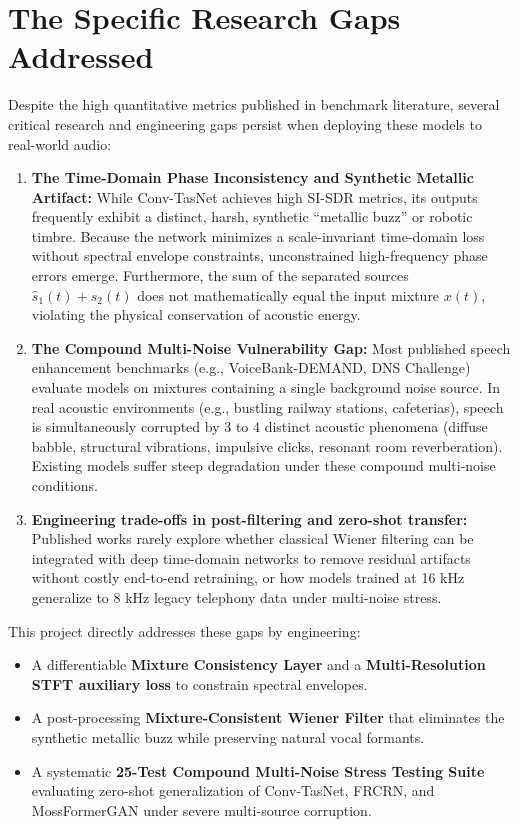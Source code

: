 \documentclass[11pt,a4paper]{report}
\begin{document}
\section{The Specific Research Gaps Addressed}
Despite the high quantitative metrics published in benchmark literature, several critical research and engineering gaps persist when deploying these models to real-world audio:
\begin{enumerate}
    \item \textbf{The Time-Domain Phase Inconsistency and Synthetic Metallic Artifact:} While Conv-TasNet achieves high SI-SDR metrics, its outputs frequently exhibit a distinct, harsh, synthetic ``metallic buzz'' or robotic timbre. Because the network minimizes a scale-invariant time-domain loss without spectral envelope constraints, unconstrained high-frequency phase errors emerge. Furthermore, the sum of the separated sources $\hat{s}_1(t) + \hat{s}_2(t)$ does not mathematically equal the input mixture $x(t)$, violating the physical conservation of acoustic energy.
    \item \textbf{The Compound Multi-Noise Vulnerability Gap:} Most published speech enhancement benchmarks (e.g., VoiceBank-DEMAND, DNS Challenge) evaluate models on mixtures containing a single background noise source. In real acoustic environments (e.g., bustling railway stations, cafeterias), speech is simultaneously corrupted by 3 to 4 distinct acoustic phenomena (diffuse babble, structural vibrations, impulsive clicks, resonant room reverberation). Existing models suffer steep degradation under these compound multi-noise conditions.
    \item \textbf{Engineering trade-offs in post-filtering and zero-shot transfer:} Published works rarely explore whether classical Wiener filtering can be integrated with deep time-domain networks to remove residual artifacts without costly end-to-end retraining, or how models trained at 16 kHz generalize to 8 kHz legacy telephony data under multi-noise stress.
\end{enumerate}

This project directly addresses these gaps by engineering:
\begin{itemize}
    \item A differentiable \textbf{Mixture Consistency Layer} and a \textbf{Multi-Resolution STFT auxiliary loss} to constrain spectral envelopes.
    \item A post-processing \textbf{Mixture-Consistent Wiener Filter} that eliminates the synthetic metallic buzz while preserving natural vocal formants.
    \item A systematic \textbf{25-Test Compound Multi-Noise Stress Testing Suite} evaluating zero-shot generalization of Conv-TasNet, FRCRN, and MossFormerGAN under severe multi-source corruption.
\end{itemize}
\end{document}
